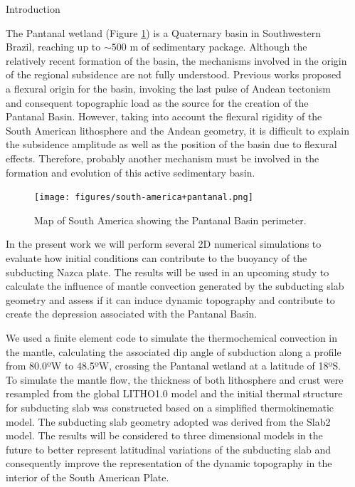 \documentclass[final]{beamer}
\newlength{\sepwidth}
\newlength{\colwidth}
\newcommand{\separatorcolumn}{\begin{column}{\sepwidth}\end{column}}
\begin{document}


\begin{frame}[t]

\begin{columns}[t]
\separatorcolumn

\begin{column}{\colwidth}
  \begin{block}{Introduction}

    The Pantanal wetland (Figure \ref{fig:pantanal-basin}) is a Quaternary basin in Southwestern Brazil, reaching up to $\sim500$ m of sedimentary package. Although the relatively recent formation of the basin, the mechanisms involved in the origin of the regional subsidence are not fully understood. Previous works proposed a flexural origin for the basin, invoking the last pulse of Andean tectonism and consequent topographic load as the source for the creation of the Pantanal Basin. However, taking into account the flexural rigidity of the South American lithosphere and the Andean geometry, it is difficult to explain the subsidence amplitude as well as the position of the basin due to flexural effects. Therefore, probably another mechanism must be involved in the formation and evolution of this active sedimentary basin. 

    \begin{figure}
        \centering
        \texttt{[image: figures/south-america+pantanal.png]}
        \caption{ Map of South America showing the Pantanal Basin perimeter.}
        \label{fig:pantanal-basin}
    \end{figure}

    In the present work we will perform several 2D numerical simulations to evaluate how initial conditions can contribute to the buoyancy of the subducting Nazca plate. The results will be used in an upcoming study to calculate the influence of mantle convection generated by the subducting slab geometry and assess if it can induce dynamic topography and contribute to create the depression associated with the Pantanal Basin. 

    We used a finite element code to simulate the thermochemical convection in the mantle, calculating the associated dip angle of subduction along a profile from 80.0ºW to 48.5ºW, crossing the Pantanal wetland at a latitude of 18ºS. To simulate the mantle flow, the thickness of both lithosphere and crust were resampled from the global LITHO1.0 model and the initial thermal structure for subducting slab was constructed based on a simplified thermokinematic model. The subducting slab geometry adopted was derived from the Slab2 model. The results will be considered to three dimensional models in the future to better represent latitudinal variations of the subducting slab and consequently improve the representation of the dynamic topography in the interior of the South American Plate. 
    

\end{block}
\end{column}
\end{columns}
\end{frame}
\end{document}
